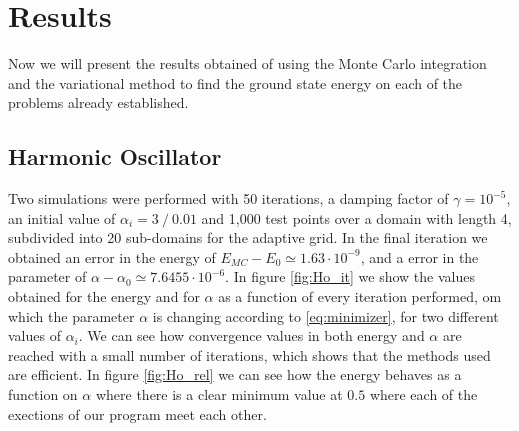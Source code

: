 
\section{Results}
Now we will present the results obtained of using the Monte Carlo integration and the variational
method to find the ground state energy on each of the problems already established.

\subsection{Harmonic Oscillator}
Two simulations were performed with 50 iterations, a damping factor of $\gamma = 10^{-5}$,
an initial value of $\alpha_i = 3~/~ 0.01$  and 1,000 test points over a domain with length 4,
subdivided into 20 sub-domains for the adaptive grid. In the final iteration we obtained an
error in the energy of $E_{MC}-E_0 \simeq 1.63\cdot 10^{-9}$,
and a error in the parameter of $\alpha - \alpha_0 \simeq 7.6455\cdot 10^{-6}$. In figure \ref{fig:Ho_it}
we show the values obtained for the energy and for $\alpha$ as a function of every iteration performed,
om which the parameter $\alpha$ is changing according to \ref{eq:minimizer},
for two different values of $\alpha_i$. We can see how  convergence values in both energy and $\alpha$ are
reached with a small number of iterations, which shows that the methods used are efficient. In figure
 \ref{fig:Ho_rel} we can see how the energy behaves as a function on $\alpha$ where there is a clear
minimum value at $0.5$ where each of the exections of our program meet each other.
